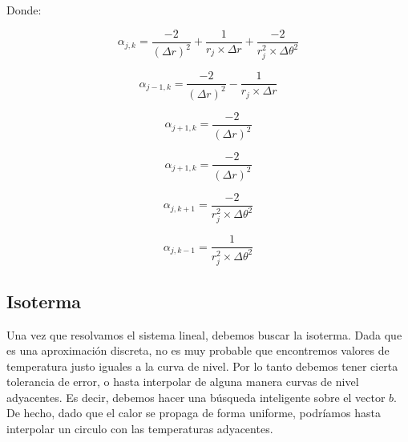 Donde:

\begin{equation}
\alpha_{j,k} = \frac{-2}{(\Delta r)^2} + \frac{1}{r_j \times \Delta r} + \frac{-2}{r_j^2 \times \Delta \theta^2}
\end{equation}

\begin{equation}
\alpha_{j-1,k} = \frac{-2}{(\Delta r)^2} - \frac{1}{r_j \times \Delta r}
\end{equation}

\begin{equation}
\alpha_{j+1,k} = \frac{-2}{(\Delta r)^2}
\end{equation}

\begin{equation}
\alpha_{j+1,k} = \frac{-2}{(\Delta r)^2}
\end{equation}

\begin{equation}
\alpha_{j,k+1} = \frac{-2}{r_j^2 \times \Delta \theta^2}
\end{equation}

\begin{equation}
\alpha_{j,k-1} = \frac{1}{r_j^2 \times \Delta \theta^2}
\end{equation}

\subsection{Isoterma}
Una vez que resolvamos el sistema lineal, debemos buscar la isoterma. Dada que es una aproximación discreta, no es muy probable que encontremos valores de temperatura justo iguales a la curva de nivel. Por lo tanto debemos tener cierta tolerancia de error, o hasta interpolar de alguna manera curvas de nivel adyacentes. Es decir, debemos hacer una búsqueda inteligente sobre el vector $b$. De hecho, dado que el calor se propaga de forma uniforme, podríamos hasta interpolar un circulo con las temperaturas adyacentes.